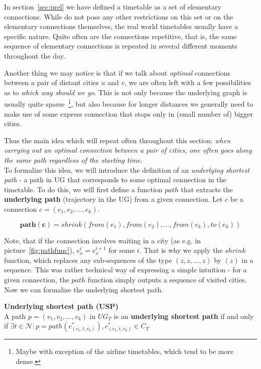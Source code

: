 In section~\ref{sec:prel} we have defined a timetable as a set of elementary connections. While do not pose any other restrictions on this set or on the elementary connections themselves, the real world timetables usually have a specific nature. Quite often are the connections repetitive, that is, the same sequence of elementary connections is repeated in several different moments throughout the day.

Another thing we may notice is that if we talk about \textit{optimal} connections between a pair of distant cities $u$ and $v$, we are often left with a few possibilities as to \textit{which way should we go}. This is not only because the underlying graph is usually quite sparse~\footnote{Maybe with exception of the airline timetables, which tend to be more dense.}, but also because for longer distances we generally need to make use of some express connection that stops only in (small number of) bigger cities.

Thus the main idea which will repeat often throughout this section: \textit{when carrying out an optimal connection between a pair of cities, one often goes along the same path regardless of the starting time}. \\

\noindent To formalize this idea, we will introduce the definition of an \textit{underlying shortest path} - a path in UG that corresponds to some optimal connection in the timetable. To do this, we will first define a function $path$ that extracts the \textbf{underlying path} (trajectory in the UG) from a given connection. Let $c$ be a connection $c = (e_{1}, e_{2}, ..., e_{k})$.

\begin{equation*}
	\bm{path(c)} = shrink(from(e_{1}), from(e_{2}), ..., from(e_{k}), to(e_{k}))
\end{equation*}

\noindent Note, that if the connection involves waiting in a city (as e.g. in picture~\ref{fig:pathfunc}), $e_{x}^{i} = e_{x}^{i + 1}$ for some $i$. That is why we apply the $shrink$ function, which replaces any sub-sequences of the type $(z, z, ..., z)$ by $(z)$ in a sequence. This was rather technical way of expressing a simple intuition - for a given connection, the $path$ function simply outputs a sequence of visited cities. Now we can formalize the underlying shortest path.

\begin{definition}
    \textbf{Underlying shortest path (USP)} \\
	A path $p = (v_{1}, v_{2}, ..., v_{k})$ in $UG_{T}$ is an \textbf{underlying shortest path} if and only if $\exists t \in \mathcal{N}: p = path(c_{(v_{1}, t, v_{k})}^{*}), c_{(v_{1}, t, v_{k})}^{*} \in C_{T}$
\end{definition}
    
